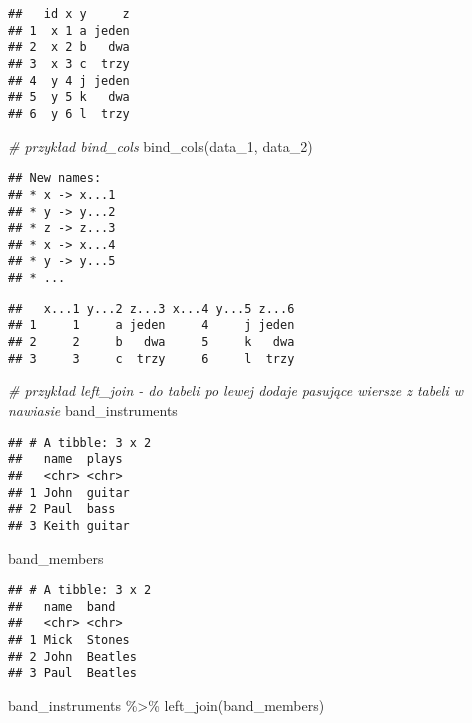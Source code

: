 \documentclass[
]{book}
\newenvironment{Shaded}{\begin{snugshade}}{\end{snugshade}}
\newcommand{\CommentTok}[1]{\textcolor[rgb]{0.56,0.35,0.01}{\textit{#1}}}
\newcommand{\FunctionTok}[1]{\textcolor[rgb]{0.00,0.00,0.00}{#1}}
\newcommand{\NormalTok}[1]{#1}
\newcommand{\SpecialCharTok}[1]{\textcolor[rgb]{0.00,0.00,0.00}{#1}}
\begin{document}
\begin{verbatim}
##   id x y     z
## 1  x 1 a jeden
## 2  x 2 b   dwa
## 3  x 3 c  trzy
## 4  y 4 j jeden
## 5  y 5 k   dwa
## 6  y 6 l  trzy
\end{verbatim}

\begin{Shaded}
\begin{Highlighting}[]
\CommentTok{\# przykład bind\_cols}
\FunctionTok{bind\_cols}\NormalTok{(data\_1, data\_2)}
\end{Highlighting}
\end{Shaded}

\begin{verbatim}
## New names:
## * x -> x...1
## * y -> y...2
## * z -> z...3
## * x -> x...4
## * y -> y...5
## * ...
\end{verbatim}

\begin{verbatim}
##   x...1 y...2 z...3 x...4 y...5 z...6
## 1     1     a jeden     4     j jeden
## 2     2     b   dwa     5     k   dwa
## 3     3     c  trzy     6     l  trzy
\end{verbatim}

\begin{Shaded}
\begin{Highlighting}[]
\CommentTok{\# przykład left\_join {-} do tabeli po lewej dodaje pasujące wiersze z tabeli w nawiasie}
\NormalTok{band\_instruments}
\end{Highlighting}
\end{Shaded}

\begin{verbatim}
## # A tibble: 3 x 2
##   name  plays 
##   <chr> <chr> 
## 1 John  guitar
## 2 Paul  bass  
## 3 Keith guitar
\end{verbatim}

\begin{Shaded}
\begin{Highlighting}[]
\NormalTok{band\_members}
\end{Highlighting}
\end{Shaded}

\begin{verbatim}
## # A tibble: 3 x 2
##   name  band   
##   <chr> <chr>  
## 1 Mick  Stones 
## 2 John  Beatles
## 3 Paul  Beatles
\end{verbatim}

\begin{Shaded}
\begin{Highlighting}[]
\NormalTok{band\_instruments }\SpecialCharTok{\%\textgreater{}\%} \FunctionTok{left\_join}\NormalTok{(band\_members)}
\end{Highlighting}
\end{Shaded}
\end{document}

